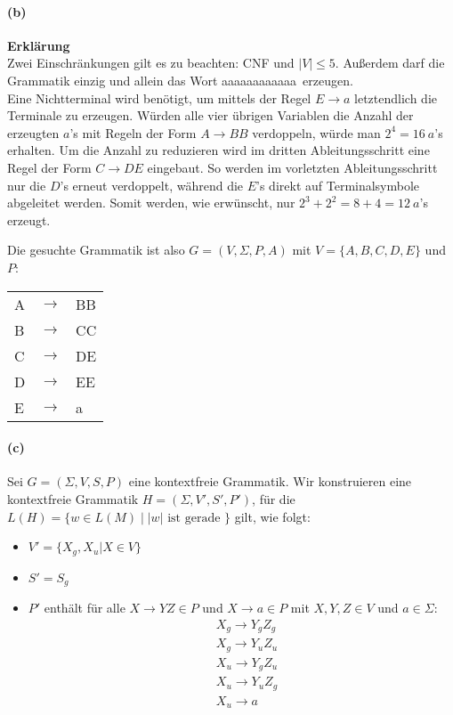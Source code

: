 \paragraph{(b)}
	\textbf{Erklärung} \\
	Zwei Einschränkungen gilt es zu beachten: CNF und $|V| \leq 5$. Außerdem darf die Grammatik einzig und allein das Wort \glqq aaaaaaaaaaaa\grqq\ erzeugen. \\
	Eine Nichtterminal wird benötigt, um mittels der Regel $E\rightarrow a$ letztendlich die Terminale zu erzeugen.
	Würden alle vier übrigen Variablen die Anzahl der erzeugten $a$'s mit Regeln der Form $A\rightarrow BB$ verdoppeln, würde man $2^4=16\ a$'s erhalten. Um die Anzahl zu reduzieren wird im dritten Ableitungsschritt eine Regel der Form $C\rightarrow DE$ eingebaut. So werden im vorletzten Ableitungsschritt nur die $D$'s erneut verdoppelt, während die $E$'s direkt auf Terminalsymbole abgeleitet werden. Somit werden, wie erwünscht, nur $2^3 + 2^2 = 8 + 4 = 12\ a$'s erzeugt.

	Die gesuchte Grammatik ist also $G = (V, \Sigma, P, A)$ mit $V = \{A, B, C, D, E\}$ und $P$:
	
	\begin{tabular}{lcl}
		A & $\rightarrow$ & BB \\
		B & $\rightarrow$ & CC \\
		C & $\rightarrow$ & DE \\
		D & $\rightarrow$ & EE \\
		E & $\rightarrow$ & a  \\
	\end{tabular}
	
\paragraph{(c)}
	Sei $G = (\Sigma, V, S, P)$ eine kontextfreie Grammatik. Wir konstruieren eine kontextfreie Grammatik $H = (\Sigma, V', S', P')$, für die $L(H) = \{ w \in L(M) \mid |w| \text{ ist gerade }\}$ gilt, wie folgt:

	\begin{itemize}
		\item $V' = \{X_g, X_u | X \in V\}$
		\item $S' = S_g$
		\item $P'$ enthält für alle $X\rightarrow YZ \in P$ und $X\rightarrow a \in P$ mit $X, Y, Z\in V$ und $a \in \Sigma$:
		\begin{align*}
			&X_g\rightarrow Y_gZ_g\\
			&X_g\rightarrow Y_uZ_u\\
			&X_u\rightarrow Y_gZ_u\\
			&X_u\rightarrow Y_uZ_g\\
			&X_u\rightarrow a
		\end{align*}
	\end{itemize}

